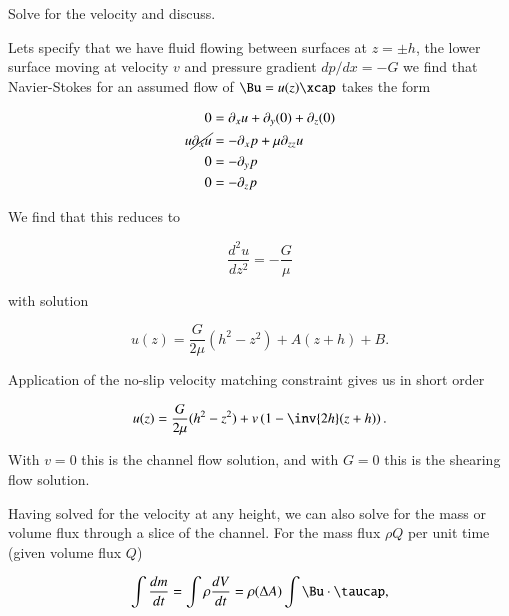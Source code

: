 \begin{Exercise}[
title={Rectilinear flow with shear and pressure gradients},
label={problem:fluids:review:q1}
]
Solve for the velocity and discuss.
\end{Exercise}

\begin{Answer}[ref={problem:fluids:review:q1}]
Lets specify that we have fluid flowing between surfaces at $z = \pm h$, the lower surface moving at velocity $v$ and pressure gradient $dp/dx = -G$ we find that Navier-Stokes for an assumed flow of $\Bu = u(z) \xcap$ takes the form

\begin{align}\label{eqn:continuumFluidsReview:1270}
0 &= \partial_x u + \partial_y (0) + \partial_z (0) \\
u \cancel{\partial_x u} &= - \partial_x p + \mu \partial_{zz} u \\
0 &= -\partial_y p \\
0 &= -\partial_z p
\end{align}

We find that this reduces to 

\begin{equation}\label{eqn:continuumFluidsReview:1290}
\frac{d^2 u}{dz^2} = -\frac{G}{\mu}
\end{equation}

with solution

\begin{equation}\label{eqn:continuumFluidsReview:1310}
u(z) = \frac{G}{2\mu}(h^2 - z^2) + A (z + h) + B.
\end{equation}

Application of the no-slip velocity matching constraint gives us in short order

\begin{equation}\label{eqn:continuumFluidsReview:1330}
u(z) = \frac{G}{2\mu}(h^2 - z^2) + v \left( 1 - \inv{2h} (z + h) \right).
\end{equation}

With $v = 0$ this is the channel flow solution, and with $G = 0$ this is the shearing flow solution.

Having solved for the velocity at any height, we can also solve for the mass or volume flux through a slice of the channel.  For the mass flux $\rho Q$ per unit time (given volume flux $Q$)

\begin{equation}\label{eqn:continuumFluidsReview:1350}
\int \frac{dm}{dt} 
=
\int \rho \frac{dV}{dt} 
=
\rho (\Delta A) \int \Bu \cdot \taucap,
\end{equation}


\end{Answer}

